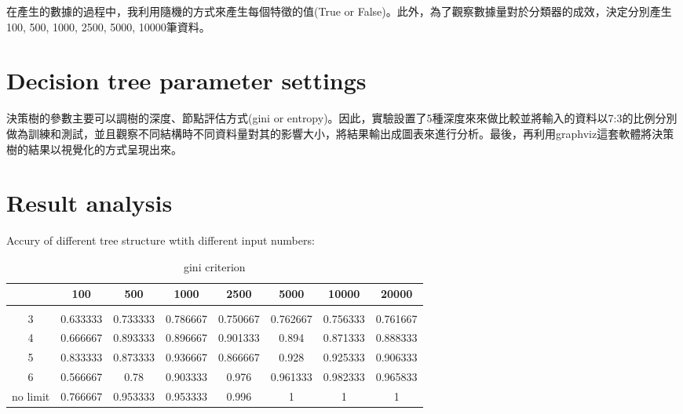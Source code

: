 \documentclass[8pt,a4paper]{article}
\begin{document}
在產生的數據的過程中，我利用隨機的方式來產生每個特徵的值(True or False)。此外，為了觀察數據量對於分類器的成效，決定分別產生100, 500, 1000, 2500, 5000, 10000筆資料。\\

\section*{Decision tree parameter settings} 
\label{sec:Decision tree parameter settings}

決策樹的參數主要可以調樹的深度、節點評估方式(gini or entropy)。因此，實驗設置了5種深度來來做比較並將輸入的資料以7:3的比例分別做為訓練和測試，並且觀察不同結構時不同資料量對其的影響大小，將結果輸出成圖表來進行分析。最後，再利用graphviz這套軟體將決策樹的結果以視覺化的方式呈現出來。\\



\section*{Result analysis} 
\label{sec:Result analysis}

Accury of different tree structure wtith different input numbers:\\

\begin{table}[H]
    \centering
    \begin{tabular}{cccccccc}
        \hline
     & 100 & 500 & 1000 & 2500 & 5000 & 10000 & 20000 \\ \hline \\
    3 & 0.633333 & 0.733333 & 0.786667 & 0.750667 & 0.762667 & 0.756333 & 0.761667 \\
    4 & 0.666667 & 0.893333 & 0.896667 & 0.901333 & 0.894 & 0.871333 & 0.888333 \\
    5 & 0.833333 & 0.873333 & 0.936667 & 0.866667 & 0.928 & 0.925333 & 0.906333 \\
    6 & 0.566667 & 0.78 & 0.903333 & 0.976 & 0.961333 & 0.982333 & 0.965833 \\
    no limit & 0.766667 & 0.953333 & 0.953333 & 0.996 & 1 & 1 & 1
    \end{tabular}
    \caption{gini criterion}
    \label{tab:gini_table}
\end{table}
\end{document}

